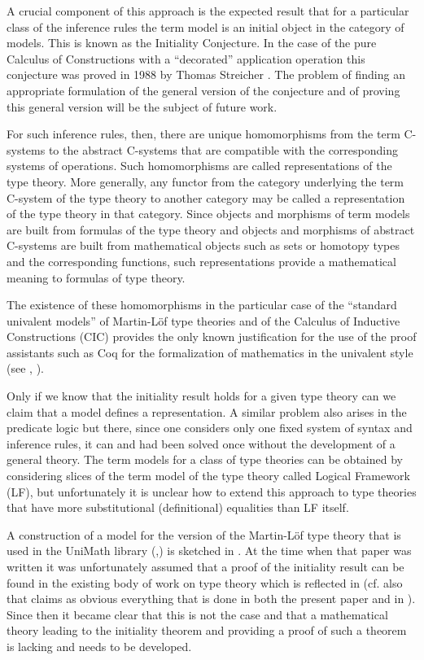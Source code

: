 \documentclass[11pt]{article}
\begin{document}
A crucial component of this approach is the expected result that for a particular class of the inference rules the term model is an initial object in the category of models. This is known as the Initiality Conjecture. In the case of the pure Calculus of Constructions with a ``decorated''  application operation this conjecture was proved in 1988 by Thomas Streicher \cite{Streicher}. The problem of finding an appropriate formulation of the general version of the conjecture and of proving this general version will be the subject of future work. 

For such inference rules, then, there are unique homomorphisms from the term C-systems to the abstract C-systems that are compatible with the corresponding systems of operations. Such homomorphisms are called representations of the type theory. More generally, any functor from the category underlying the term C-system of the type theory to another category may be called a representation of the type theory in that category. Since objects and morphisms of term models are built from formulas of the type theory and objects and morphisms of abstract C-systems are built from mathematical objects such as sets or homotopy types and the corresponding functions, such representations provide a mathematical meaning to formulas of type theory. 

The existence of these homomorphisms in the particular case of the ``standard univalent models'' of  Martin-L\"{o}f type theories and of the Calculus of Inductive Constructions (CIC) provides the only known justification for the use of the proof assistants such as Coq for the formalization of mathematics in the univalent style (see \cite{UniMath}, \cite{UniMath2015}). 

Only if we know that the initiality result holds for a given type theory can we claim that a model defines a representation. A similar problem also arises in the predicate logic but there, since one considers only one fixed system of syntax and inference rules, it can and had been solved once without the development of a general theory. The term models for a class of type theories can be obtained by considering slices of the term model of the type theory called Logical Framework (LF), but unfortunately it is unclear how to extend this approach to type theories that have more substitutional (definitional) equalities than LF itself.

A construction of a model for the version of the Martin-L\"{o}f type theory that is used in the UniMath library (\cite{UniMath},\cite{UniMath2015}) is sketched in \cite{KLV1}. At the time when that paper was written it was unfortunately assumed that a proof of the initiality result can be found in the existing body of work on type theory which is reflected  in \cite[Theorem 1.2.9]{KLV1} (cf. also \cite[Example 1.2.3]{KLV1} that claims as obvious everything that is done in both the present paper and in \cite{Csubsystems}).  Since then it became clear that this is not the case and that a mathematical theory leading to the initiality theorem and providing a proof of such a theorem is lacking and needs to be developed. 
\end{document}
